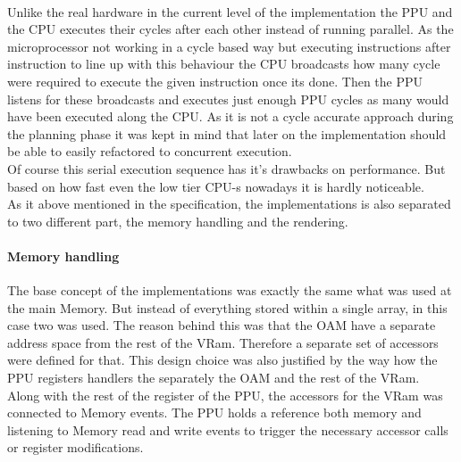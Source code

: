 \documentclass[]{report}
\begin{document}
\paragraph{ }
Unlike the real hardware in the current level of the implementation the PPU and the CPU executes their cycles after each other instead of running  parallel. As the microprocessor not working in a cycle based way but executing instructions after instruction to line up with this behaviour the CPU broadcasts how many cycle were required to execute the given instruction once its done. Then the PPU listens for these broadcasts and executes just enough PPU cycles as many would have been executed along the CPU. As it is not a cycle accurate approach during the planning phase it was kept in mind that later on the implementation should be able to easily refactored to concurrent execution.
\\
Of course this serial execution sequence has it's drawbacks on performance. But based on how fast even the low tier CPU-s nowadays it is hardly noticeable.
\\
As it above mentioned in the specification, the implementations is also separated to two different part, the memory handling and the rendering.

\paragraph{Memory handling}
The base concept of the implementations was exactly the same what was used at the main Memory.
But instead of everything stored within a single array, in this case two was used. The reason behind this was that the OAM have a separate address space from the rest of the VRam. Therefore a separate set of accessors were defined for that. This design choice was also justified by the way how the PPU registers handlers the separately the OAM and the rest of the VRam.
\\
Along with the rest of the register of the PPU, the accessors for the VRam was connected to Memory events. The PPU holds a reference both memory and listening to Memory read and write events to trigger the necessary accessor calls or register modifications.
\end{document}
